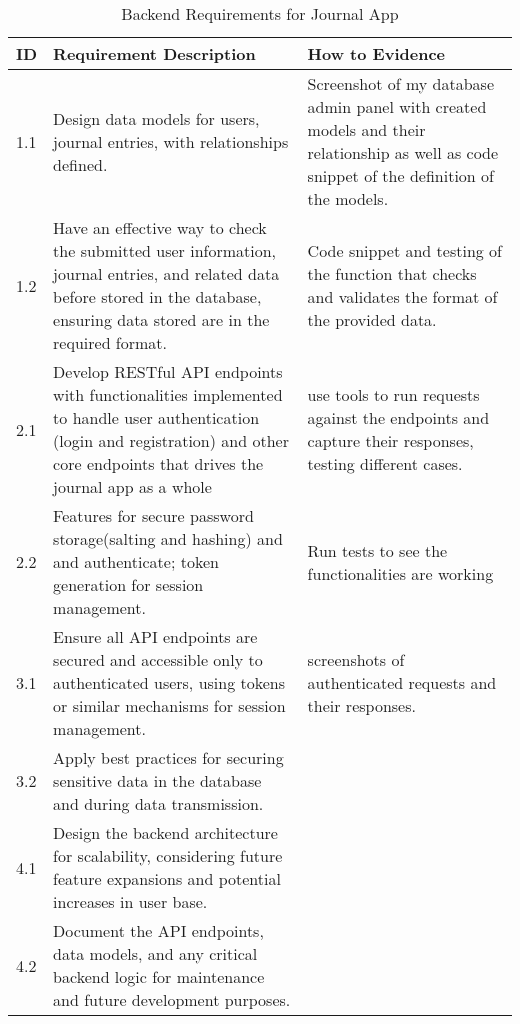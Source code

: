 \begin{table}[H]
\centering
\begin{tabular}{|l|p{8cm}|p{4cm}|}  
\hline
\textbf{ID} & \textbf{Requirement Description}& \textbf{How to Evidence} \\ \hline
1.1 & Design data models for users, journal entries, with relationships defined. & Screenshot of my database admin panel with created models and their relationship as well as code snippet of the definition of the models. \\ \hline

1.2 & Have an effective way to check the submitted user information, journal entries, and related data before stored in the database, ensuring data stored are in the required format. & Code snippet and testing of the function that checks and validates the format of the provided data. \\ \hline

2.1 & Develop RESTful API endpoints with functionalities implemented to handle user authentication (login and registration) and other core endpoints that drives the journal app as a whole & use tools to run requests against the endpoints and capture their responses, testing different cases.\\ \hline

2.2 & Features for secure password storage(salting and hashing) and and authenticate; token generation for session management.& Run tests to see the functionalities are working\\ \hline

3.1 & Ensure all API endpoints are secured and accessible only to authenticated users, using tokens or similar mechanisms for session management.& screenshots of authenticated requests and their responses. \\ \hline

3.2 & Apply best practices for securing sensitive data in the database and during data transmission. \\ \hline
4.1 & Design the backend architecture for scalability, considering future feature expansions and potential increases in user base. \\ \hline
4.2 & Document the API endpoints, data models, and any critical backend logic for maintenance and future development purposes. \\ \hline
\end{tabular}
\caption{Backend Requirements for Journal App}
\end{table}


